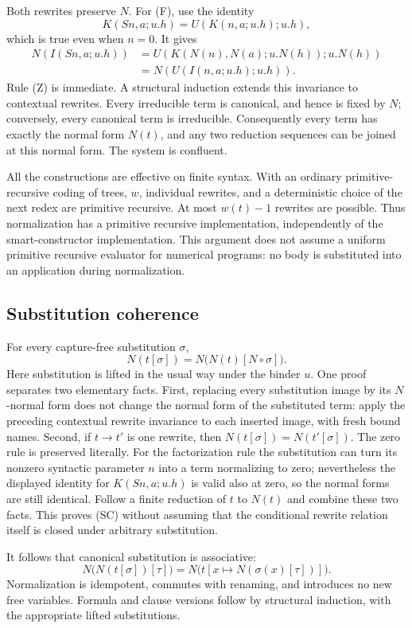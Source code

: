 Both rewrites preserve $N$.  For (F), use the identity
\[
 K(Sn,a;u.h)=U(K(n,a;u.h);u.h),
\]
which is true even when $n=0$.  It gives
\begin{align*}
 N(I(Sn,a;u.h))
 &=U(K(N(n),N(a);u.N(h));u.N(h))\\
 &=N(U(I(n,a;u.h);u.h)).
\end{align*}
Rule (Z) is immediate.  A structural induction extends this invariance
to contextual rewrites.  Every irreducible term is canonical, and hence
is fixed by $N$; conversely, every canonical term is irreducible.
Consequently every term has exactly the normal form $N(t)$, and any
two reduction sequences can be joined at this normal form.  The system
is confluent.

All the constructions are effective on finite syntax.  With an ordinary
primitive-recursive coding of trees, $w$, individual rewrites, and a
deterministic choice of the next redex are primitive recursive.  At most
$w(t)-1$ rewrites are possible.  Thus normalization has a primitive
recursive implementation, independently of the smart-constructor
implementation.  This argument does not assume a uniform primitive
recursive evaluator for numerical programs: no body is substituted into
an application during normalization.

\subsection{Substitution coherence}

For every capture-free substitution $\sigma$,
\[
 N(t[\sigma])=N\bigl(N(t)[N\circ\sigma]\bigr). \tag{SC}
\]
Here substitution is lifted in the usual way under the binder $u$.
One proof separates two elementary facts.  First, replacing every
substitution image by its $N$-normal form does not change the normal
form of the substituted term: apply the preceding contextual rewrite
invariance to each inserted image, with fresh bound names.
Second, if $t\longrightarrow t'$ is one rewrite, then
$N(t[\sigma])=N(t'[\sigma])$.  The zero rule is preserved literally.
For the factorization rule the substitution can turn its nonzero
syntactic parameter $n$ into a term normalizing to zero; nevertheless
the displayed identity for $K(Sn,a;u.h)$ is valid also at zero, so the
normal forms are still identical.  Follow a finite reduction of $t$ to
$N(t)$ and combine these two facts.  This proves (SC) without assuming
that the conditional rewrite relation itself is closed under arbitrary
substitution.

It follows that canonical substitution is associative:
\[
 N\bigl(N(t[\sigma])[\tau]\bigr)
 =N\bigl(t[x\mapsto N(\sigma(x)[\tau])]\bigr).
\]
Normalization is idempotent, commutes with renaming, and introduces no
new free variables.  Formula and clause versions follow by structural
induction, with the appropriate lifted substitutions.

